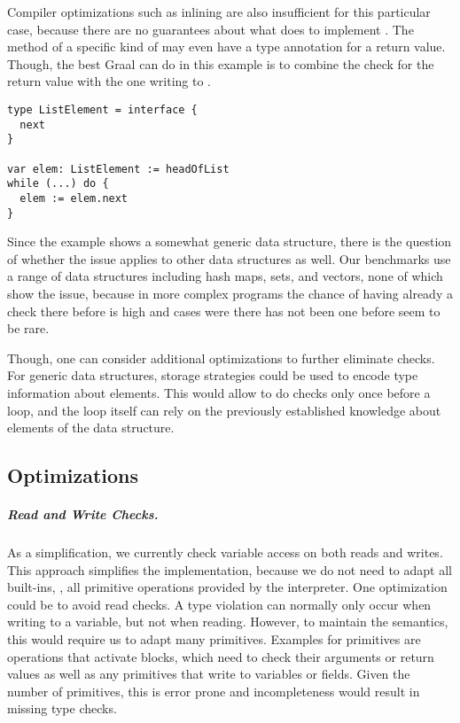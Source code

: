 Compiler optimizations such as inlining are also insufficient
for this particular case, because there are no guarantees about what
 does to implement .
The  method of a specific kind of  may even have
a type annotation for a return value.
Though, the best Graal can do in this example is to combine the check for the
return value with the one writing to .

\begin{lstlisting}[caption={Example for dynamic type checks not corresponding to existing checks.},%
  escapechar=|,label={ex:pathological-case},%
  float,floatplacement=htb]
type ListElement = interface {
  next
}

var elem: ListElement := headOfList
while (...) do {
  elem := elem.next
}
\end{lstlisting}

Since the example shows a somewhat generic data structure,
there is the question of whether the issue applies to other data structures as
well.
Our benchmarks use a range of data structures including hash maps, sets,
and vectors, none of which show the issue, because in more complex programs
the chance of having already a check there before is high
and cases were there has not been one before seem to be rare.

Though, one can consider additional optimizations
to further eliminate checks.
For generic data structures, storage strategies\citep{Bolz2013}
could be used to encode type information about elements.
This would allow to do checks only once before a loop,
and the loop itself can rely on the previously established knowledge
about elements of the data structure.


\subsection{Optimizations}
\label{sec:discussion-opt}


\subparagraph{Read and Write Checks.}
\label{sec:discussion-read-write}

As a simplification, we currently check variable access
on both reads and writes.
This approach simplifies the implementation, because we do not need to
adapt all built-ins, \ie,
all primitive operations provided by the interpreter.
One optimization could be to avoid read checks.
A type violation can normally only occur when writing to a variable,
but not when reading.
However, to maintain the semantics, this would require us to adapt
many primitives.
Examples for primitives are operations that activate blocks,
which need to check their arguments or return values
as well as any primitives that write to variables or fields.
Given the number of primitives, this is error prone
and incompleteness would result in missing type checks.

